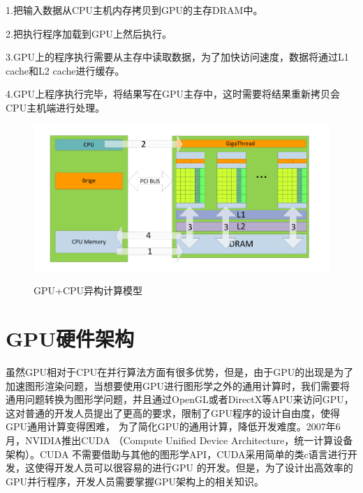 1.把输入数据从CPU主机内存拷贝到GPU的主存DRAM中。

2.把执行程序加载到GPU上然后执行。

3.GPU上的程序执行需要从主存中读取数据，为了加快访问速度，数据将通过L1 cache和L2 cache进行缓存。

4.GPU上程序执行完毕，将结果写在GPU主存中，这时需要将结果重新拷贝会CPU主机端进行处理。
\begin{figure}
\setlength{\belowcaptionskip}{-0.5cm}
  \begin{center}
    {\includegraphics[width=1 \textwidth]{figures/yigou.pdf}}
    \end{center}
  \caption{{\footnotesize{GPU+CPU异构计算模型}}}
  \label{GCY}
\end{figure}
\section{GPU硬件架构}

虽然GPU相对于CPU在并行算法方面有很多优势，但是，由于GPU的出现是为了加速图形渲染问题，当想要使用GPU进行图形学之外的通用计算时，我们需要将通用问题转换为图形学问题，并且通过OpenGL或者DirectX等APU来访问GPU，这对普通的开发人员提出了更高的要求，限制了GPU程序的设计自由度，使得GPU通用计算变得困难，
为了简化GPU的通用计算，降低开发难度。2007年6月，NVIDIA推出CUDA （Compute Unified Device Architecture，统一计算设备架构）。CUDA 不需要借助与其他的图形学API，CUDA采用简单的类c语言进行开发，这使得开发人员可以很容易的进行GPU 的开发。但是，为了设计出高效率的GPU并行程序，开发人员需要掌握GPU架构上的相关知识。

